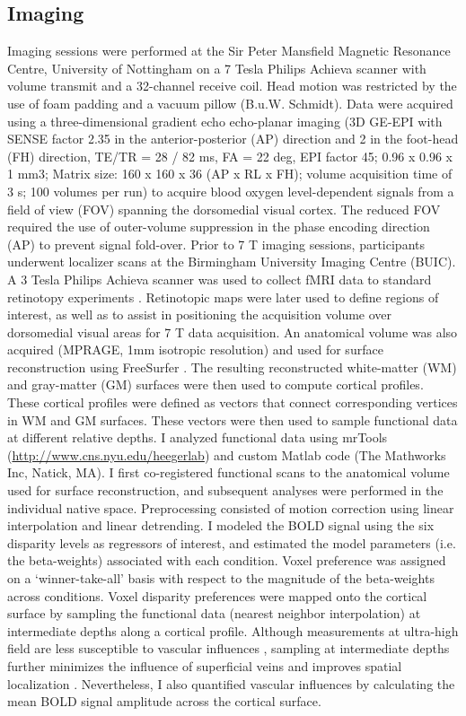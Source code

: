 \subsection{Imaging}
Imaging sessions were performed at the Sir Peter Mansfield Magnetic Resonance Centre, University of Nottingham on a 7 Tesla Philips Achieva scanner with volume transmit and a 32-channel receive coil. Head motion was restricted by the use of foam padding and a vacuum pillow (B.u.W. Schmidt). Data were acquired using a three-dimensional gradient echo echo-planar imaging (3D GE-EPI with SENSE factor 2.35 in the anterior-posterior (AP) direction and 2 in the foot-head (FH) direction, TE/TR = 28 / 82 ms, FA = 22 deg, EPI factor 45; 0.96 x 0.96 x 1 mm3; Matrix size: 160 x 160 x 36 (AP x RL x FH); volume acquisition time of 3 s; 100 volumes per run) to acquire blood oxygen level-dependent signals from a field of view (FOV) spanning the dorsomedial visual cortex. The reduced FOV required the use of outer-volume suppression in the phase encoding direction (AP) to prevent signal fold-over.
Prior to 7 T imaging sessions, participants underwent localizer scans at the Birmingham University Imaging Centre (BUIC). A 3 Tesla Philips Achieva scanner was used to collect fMRI data to standard retinotopy experiments \cite{Preston:2008dg}. Retinotopic maps were later used to define regions of interest, as well as to assist in positioning the acquisition volume over dorsomedial visual areas for 7 T data acquisition. An anatomical volume was also acquired (MPRAGE, 1mm isotropic resolution) and used for surface reconstruction using FreeSurfer \cite{Dale:1999ks,Fischl:1999hg}. The resulting reconstructed white-matter (WM) and gray-matter (GM) surfaces were then used to compute cortical profiles. These cortical profiles were defined as vectors that connect corresponding vertices in WM and GM surfaces. These vectors were then used to sample functional data at different relative depths.
I analyzed functional data using mrTools (\url{http://www.cns.nyu.edu/heegerlab}) and custom Matlab code (The Mathworks Inc, Natick, MA). I first co-registered functional scans to the anatomical volume used for surface reconstruction, and subsequent analyses were performed in the individual native space. Preprocessing consisted of motion correction using linear interpolation and linear detrending. I modeled the BOLD signal using the six disparity levels as regressors of interest, and estimated the model parameters (i.e. the beta-weights) associated with each condition. Voxel preference was assigned on a `winner-take-all' basis with respect to the magnitude of the beta-weights across conditions. Voxel disparity preferences were mapped onto the cortical surface by sampling the functional data (nearest neighbor interpolation) at intermediate depths along a cortical profile. Although measurements at ultra-high field are less susceptible to vascular influences \cite{Gati:1997uq,Ogawa:1998fk,Ugurbil:2003uq}, sampling at intermediate depths further minimizes the influence of superficial veins \cite{SanchezPanchuelo:2012jq} and improves spatial localization \cite{Polimeni:2010fl}. Nevertheless, I also quantified vascular influences by calculating the mean BOLD signal amplitude across the cortical surface.

